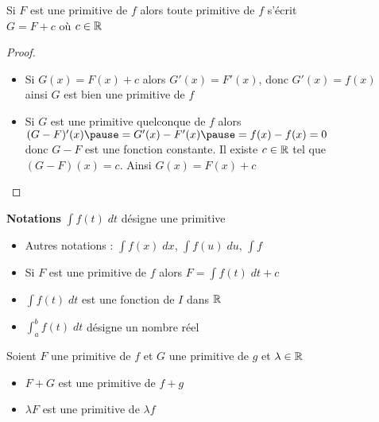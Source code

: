 \begin{frame}


\begin{proposition}
Si $F$ est une primitive de $f$ alors
toute primitive de $f$ s'écrit \\
\hfil\hfil $G=F+c$ \quad où $c\in \mathbb{R}$
\end{proposition}

\pause

\begin{proof}
\begin{itemize}
  \item Si $G(x)=F(x)+c$ alors $G'(x)=F'(x)$, \pause donc $G'(x)=f(x)$\\ \pause
ainsi $G$ est bien une primitive de $f$
\pause
  \item Si $G$ est une primitive quelconque de $f$ alors  \\
\hfil \hfil $(G-F)'(x)\pause=G'(x)-F'(x)\pause=f(x)-f(x)=0$ \\
\pause donc $G-F$ est une fonction constante. \pause Il existe $c\in \mathbb{R}$ tel que $(G-F)(x)=c$.
Ainsi $G(x)=F(x)+c$
\end{itemize}
\vspace*{-2ex}
\end{proof}

\pause
\textbf{Notations} $\int f(t) \; dt$ désigne une primitive

\pause
\begin{itemize}
  \item Autres notations : $\int f(x) \; dx$,  $\int f(u) \; du$, $\int f$
\pause
  \item Si $F$ est une primitive de $f$ alors $F=\int f(t) \; dt + c$
\pause
  \item $\int f(t)\;dt$ est une fonction de $I$ dans $\mathbb{R}$
\pause
  \item $\int_a^b f(t) \; dt$ désigne un nombre réel
\end{itemize}
\end{frame}



\begin{frame}
\begin{proposition}
Soient $F$ une primitive de $f$ et $G$ une primitive de $g$ et $\lambda \in \mathbb{R}$
\begin{itemize}
  \item $F+G$ est une primitive de $f+g$
\pause
  \item $\lambda F$ est une primitive de $\lambda f$
\end{itemize}
\end{proposition}
  
\bigskip
\pause


\end{frame}





